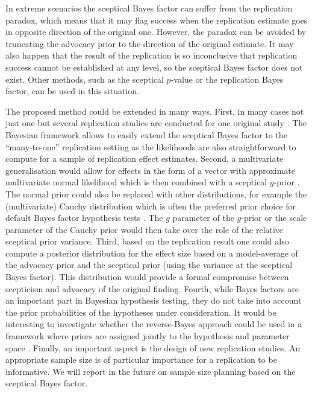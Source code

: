 In extreme scenarios the sceptical Bayes factor can suffer from the replication
paradox, which means that it may flag success when the replication estimate goes
in opposite direction of the original one. However, the paradox can be avoided
by truncating the advocacy prior to the direction of the original estimate. It
may also happen that the result of the replication is so inconclusive that
replication success cannot be established at any level, so the sceptical Bayes
factor does not exist. Other methods, such as the sceptical $p$-value or the
replication Bayes factor, can be used in this situation.


The proposed method could be extended in many ways. First, in many cases not
just one but several replication studies are conducted for one original study
\citep[\eg{} as in][]{Klein2014}. The Bayesian framework allows to easily extend
the sceptical Bayes factor to the ``many-to-one'' replication setting as the
likelihoods are also straightforward to compute for a sample of replication
effect estimates. Second, a multivariate generalisation would allow for effects
in the form of a vector with approximate multivariate normal likelihood which is
then combined with a sceptical $g$-prior \citep{Liang2008}. The normal prior
could also be replaced with other distributions, for example the (multivariate)
Cauchy distribution which is often the preferred prior choice for default Bayes
factor hypothesis tests \citep{Jeffreys1961}. The $g$ parameter of the $g$-prior
or the scale parameter of the Cauchy prior would then take over the role of the
relative sceptical prior variance. Third, based on the replication result one
could also compute a posterior distribution for the effect size based on a
model-average of the advocacy prior and the sceptical prior (using the variance
at the sceptical Bayes factor). This distribution would provide a formal
compromise between scepticism and advocacy of the original finding. Fourth,
while Bayes factors are an important part in Bayesian hypothesis testing, they
do not take into account the prior probabilities of the hypotheses under
consideration. It would be interesting to investigate whether the reverse-Bayes
approach could be used in a framework where priors are assigned jointly to the
hypothesis and parameter space \citep{Dellaportas2012}. Finally, an important
aspect is the design of new replication studies. An appropriate sample size is
of particular importance for a replication to be informative. We will report in
the future on sample size planning based on the sceptical Bayes factor.


